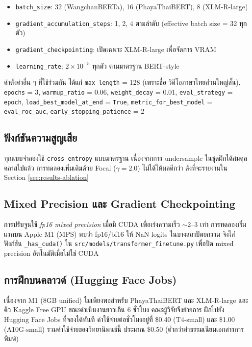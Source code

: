 \begin{itemize}[leftmargin=2em]
  \item \texttt{batch\_size}: 32 (WangchanBERTa), 16 (PhayaThaiBERT), 8 (XLM-R-large)
  \item \texttt{gradient\_accumulation\_steps}: 1, 2, 4 ตามลำดับ (effective batch
        size = 32 ทุกตัว)
  \item \texttt{gradient\_checkpointing}: เปิดเฉพาะ XLM-R-large เพื่อจัดการ VRAM
  \item \texttt{learning\_rate}: $2\!\times\!10^{-5}$ ทุกตัว ตามมาตรฐาน BERT-style
        \cite{devlin2019bert}
\end{itemize}

ค่าตั้งค่าอื่น ๆ ที่ใช้ร่วมกัน ได้แก่ \texttt{max\_length} = 128 (เพราะชื่อ
วิดีโอภาษาไทยส่วนใหญ่สั้น), \texttt{epochs} = 3,
\texttt{warmup\_ratio} = 0.06, \texttt{weight\_decay} = 0.01,
\texttt{eval\_strategy} = \texttt{epoch}, \texttt{load\_best\_model\_at\_end}
= \texttt{True}, \texttt{metric\_for\_best\_model} = \texttt{eval\_roc\_auc},
\texttt{early\_stopping\_patience} = 2

\subsection{ฟังก์ชันความสูญเสีย}

ทุกแบบจำลองใช้ \texttt{cross\_entropy} แบบมาตรฐาน เนื่องจากการ undersample
ในชุดฝึกได้สมดุลคลาสไปแล้ว การทดลองเพิ่มเติมด้วย Focal \textcite{lin2017focal}
($\gamma = 2.0$) ไม่ได้ให้ผลดีกว่า ดังที่จะรายงานใน Section
\ref{sec:results-ablation}

\subsection{Mixed Precision และ Gradient Checkpointing}

การปรับจูนใช้ \emph{fp16 mixed precision} เมื่อมี CUDA เพื่อเร่งความเร็ว
$\sim$2--3 เท่า การทดลองเริ่มแรกบน Apple M1 (MPS) พบว่า fp16/bf16 ให้
NaN logits ในบางสถาปัตยกรรม จึงใส่ฟังก์ชัน \texttt{\_has\_cuda()} ใน
\texttt{src/models/transformer\_finetune.py} เพื่อปิด mixed precision
อัตโนมัติเมื่อไม่ใช่ CUDA

\subsection{การฝึกบนคลาวด์ (Hugging Face Jobs)}

เนื่องจาก M1 (8GB unified) ไม่เพียงพอสำหรับ PhayaThaiBERT และ XLM-R-large
และคิว Kaggle Free GPU ขณะดำเนินงานยาวเกิน 6 ชั่วโมง คณะผู้วิจัยจึงย้ายการ
ฝึกไปยัง Hugging Face Jobs ที่จองได้ทันที ค่าใช้จ่ายต่อชั่วโมงอยู่ที่
\$0.40 (T4-small) และ \$1.00 (A10G-small) รวมค่าใช้จ่ายของวิทยานิพนธ์นี้
ประมาณ \$0.50 (ต่ำกว่าค่าธรรมเนียมเอกสารการพิมพ์)

